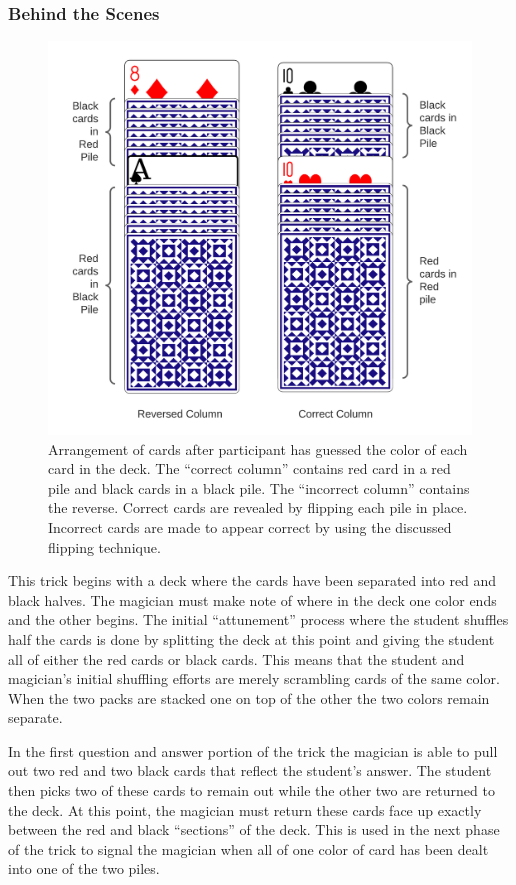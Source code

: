 \subsubsection{Behind the Scenes}
\begin{figure}[H]
\centering
\includegraphics[scale=.6]{images/Trick1}
\caption{Arrangement of cards after participant has guessed the color of each
card in the deck.  The ``correct column'' contains red card in a red pile and
black cards in a black pile.  The ``incorrect column'' contains the reverse.
Correct cards are revealed by flipping each pile in place.  Incorrect cards are
made to appear correct by using the discussed flipping technique.}
\label{fig:trick1}
\end{figure}

This trick begins with a deck where the cards have
been separated into red and black halves.
The magician must make note of where in the deck
one color ends and the other begins.  The initial ``attunement'' process where
the student shuffles half the cards is done by splitting the deck at this point
and giving the student all of either the red cards or black cards.  This means
that the student and magician's initial shuffling efforts are merely scrambling
cards of the same color.
When the two packs are stacked one on top of the other the two colors remain
separate.

In the first question and answer portion of the trick the magician is able to
pull out two red and two black cards that reflect the student's answer.  The
student then picks two of these cards to remain out while the other two are
returned to the deck.  At this point, the magician must return these cards face
up exactly between the red and black ``sections'' of the deck.  This is used in
the next phase of the trick to signal the magician when all of one color of card
has been dealt into one of the two piles.

